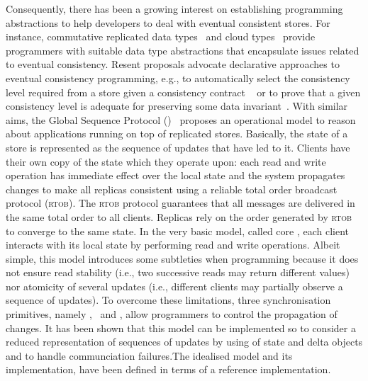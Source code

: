 Consequently,  there has been a growing interest on establishing  programming abstractions to help developers 
to deal with eventual consistent stores. For instance, commutative replicated data types~\cite{DBLP:conf/sss/ShapiroPBZ11}  and 
cloud types~\cite{burckhardt2012cloud} provide programmers with suitable data type abstractions that encapsulate issues related 
to eventual consistency. Resent proposals advocate declarative approaches to 
eventual consistency programming,  e.g.,  
to automatically select the consistency level required from a store given 
a consistency contract ~\cite{sivaramakrishnan2015declarative}
or to prove that  a given consistency level is adequate for preserving some data invariant~\cite{gotsman2016cause}.
With similar aims,
the Global Sequence Protocol (\gsp)~\cite{DBLP:conf/ecoop/BurckhardtLPF15} proposes  an operational model  
 to reason about applications 
running on top of replicated stores. Basically, the state of a store is represented as the sequence of updates that 
have led to it. Clients have their own copy of the state which they operate upon: each read and write operation has immediate
effect over the local state and the system propagates changes to make all replicas consistent using 
a reliable total order broadcast  protocol (\textsc{rtob}). The \textsc{rtob} protocol guarantees that all messages
are delivered  in the same total order to all clients. Replicas rely on the order generated  by \textsc{rtob} to 
converge to the same state. In the very basic model, called core \gsp, each client interacts with its local state 
  by performing read and write operations. Albeit simple, this model  introduces some subtleties when programming 
  because  it does not ensure read stability (i.e., two successive reads may 
return different values) nor atomicity of several updates (i.e., different clients may partially observe 
a sequence of updates). To overcome these limitations, 
 three synchronisation primitives, namely \pullcmd, \pushcmd\ and \confcmd, 
 allow programmers to control the propagation of changes. %
It has been shown that this model can be implemented so to  
consider a reduced representation of sequences of updates by using of state and delta objects and to handle communciation
failures.The idealised model and its implementation,
have been defined in terms of a reference implementation. 


